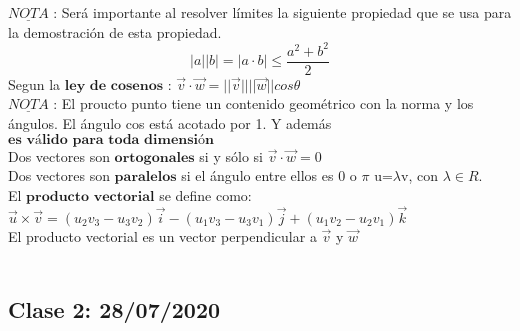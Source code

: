 \documentclass[secnumarabic,balancelastpage,amsmath,amssymb]{article}
\begin{document}
$\underline{NOTA}$ : Será importante al resolver límites la siguiente propiedad que se usa para la demostración de esta propiedad. \\
\begin{equation}
|a||b|=|a\cdot b| \leq \frac{a^{2} + b^{2}}{2}
\end{equation}
Segun la $\textbf{ley de cosenos}$ :
$\vec{v} \cdot \vec{w} = ||\vec{v}||||\vec{w}||cos \theta$ \\
$\underline{NOTA}$ : El proucto punto tiene un contenido geométrico con la norma y los ángulos. El ángulo cos está acotado por 1. Y además $\textbf{es válido para toda dimensión}$ \\
Dos vectores son $\textbf{ortogonales}$ si y sólo si $\vec{v} \cdot \vec{w} = 0$ \\
Dos vectores son $\textbf{paralelos}$ si el ángulo entre ellos es 0 o $\pi$ u=$\lambda$v, con $\lambda \in R$.\\
El $\textbf{producto vectorial}$ se define como:\\
$\vec{u} \times \vec{v} = (u_{2} v_{3} - u_{3} v_{2} ) \vec{i} - (u_{1} v_{3} - u_{3} v_{1} ) \vec{j} + (u_{1} v_{2} - u_{2} v_{1} ) \vec{k}  $\\
El producto vectorial es un vector perpendicular a $\vec{v}$ y $\vec{w}$\\\\

\subsection{Clase 2: 28/07/2020}
\end{document}
